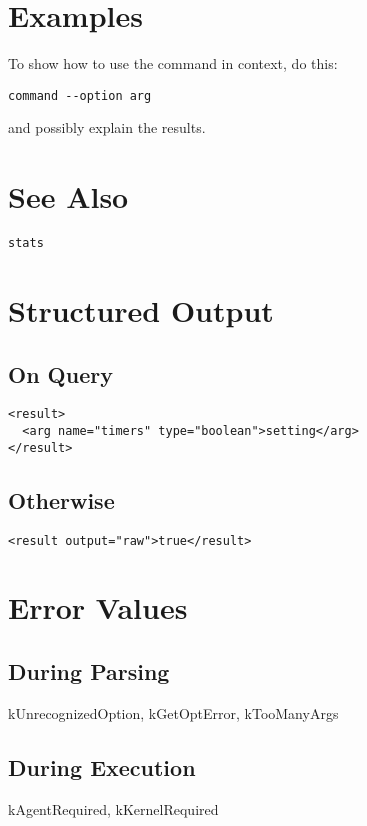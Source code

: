 \documentclass[10pt]{article}
\begin{document}
\section*{ Examples }


 To show how to use the command in context, do this: \begin{verbatim}
command --option arg

\end{verbatim}



 and possibly explain the results. 
\section*{ See Also }
\begin{verbatim}
stats

\end{verbatim}
\section*{ Structured Output }
\subsection*{ On Query }
\begin{verbatim}
<result>
  <arg name="timers" type="boolean">setting</arg>
</result>

\end{verbatim}
\subsection*{ Otherwise }
\begin{verbatim}
<result output="raw">true</result>

\end{verbatim}
\section*{ Error Values }
\subsection*{ During Parsing }


 kUnrecognizedOption, kGetOptError, kTooManyArgs
\subsection*{ During Execution }


 kAgentRequired, kKernelRequired
\end{document}
